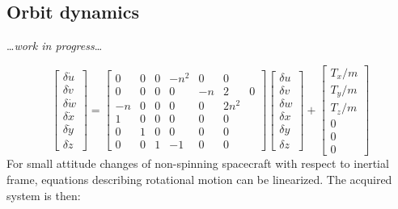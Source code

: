 \subsection{Orbit dynamics}
    \dots\textit{work in progress}\dots

    \begin{equation}
        \begin{bmatrix}  \delta\dot{u} \\ \delta\dot{v} \\ \delta\dot{w} \\ \delta\dot{x} \\ \delta\dot{y} \\ \delta\dot{z} \end{bmatrix}
        =
        \begin{bmatrix}
        0 & 0 & 0 & -n^2 & 0 & 0 \\
        0 & 0 & 0 & 0 & -n&2 & 0 \\
        -n & 0 & 0 & 0 & 0 & 2n^2 \\
        1 & 0 & 0 & 0 & 0 & 0 \\
        0 & 1 & 0 & 0 & 0 & 0 \\
        0 & 0 & 1 & -1 & 0 & 0
        \end{bmatrix}
        \begin{bmatrix}  \delta u \\ \delta v \\ \delta w \\ \delta x \\ \delta y \\ \delta z \end{bmatrix}
        +
        \begin{bmatrix}
        T_x/m \\
        T_y/m \\
        T_z/m \\
        0 \\
        0 \\
        0
        \end{bmatrix}
    \end{equation}\label{eqn:sstranslation}
    For small attitude changes of non-spinning spacecraft with respect to inertial frame, equations describing rotational motion can be linearized. The acquired system is then:
